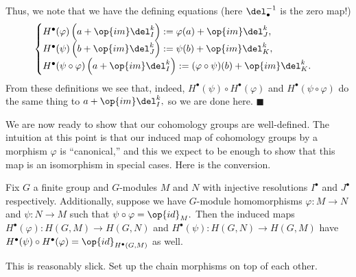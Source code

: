 Thus, we note that we have the defining equations (here $\del^{-1}_\bullet$ is the zero map!)
\[\begin{cases}
    H^\bullet(\varphi)\left(a+\op{im}\del_I^k\right):=\varphi(a)+\op{im}\del_J^k, \\
    H^\bullet(\psi)\left(b+\op{im}\del_J^k\right):=\psi(b)+\op{im}\del_K^k, \\
    H^\bullet(\psi\circ\varphi)\left(a+\op{im}\del_I^k\right):=(\varphi\circ\psi)(b)+\op{im}\del_K^k.
\end{cases}\]
From these definitions we see that, indeed, $H^\bullet(\psi)\circ H^\bullet(\varphi)$ and $H^\bullet(\psi\circ\varphi)$ do the same thing to $a+\op{im}\del_I^k,$ so we are done here. $\blacksquare$

We are now ready to show that our cohomology groups are well-defined. The intuition at this point is that our induced map of cohomology groups by a morphism $\varphi$ is ``canonical,'' and this we expect to be enough to show that this map is an isomorphism in special cases. Here is the conversion.
\begin{proposition}
    Fix $G$ a finite group and $G$-modules $M$ and $N$ with injective resolutions $I^\bullet$ and $J^\bullet$ respectively. Additionally, suppose we have $G$-module homomorphisms $\varphi:M\to N$ and $\psi:N\to M$ such that $\psi\circ\varphi=\op{id}_M.$ Then the induced maps $H^\bullet(\varphi):H(G,M)\to H(G,N)$ and $H^\bullet(\psi):H(G,N)\to H(G,M)$ have $H^\bullet(\psi)\circ H^\bullet(\varphi)=\op{id}_{H^\bullet(G,M)}$ as well.
\end{proposition}
This is reasonably slick. Set up the chain morphisms on top of each other.
\begin{center}
\end{center}
